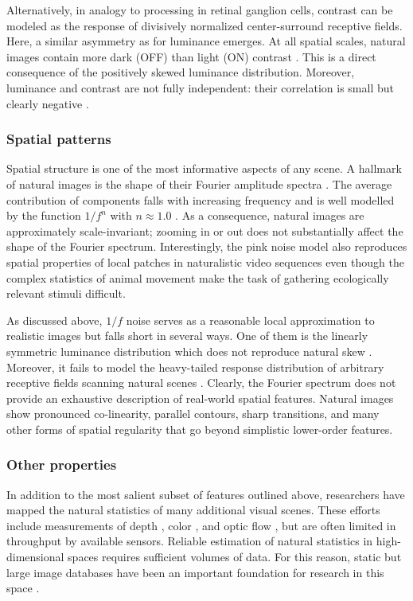 Alternatively, in analogy to processing in retinal ganglion cells, contrast can be modeled as the response of divisively normalized center-surround receptive fields. Here, a similar asymmetry as for luminance emerges. At all spatial scales, natural images contain more dark (OFF) than light (ON) contrast \citep{Ratliff:2010kb,Cooper:2015in}. This is a direct consequence of the positively skewed luminance distribution. Moreover, luminance and contrast are not fully independent: their correlation is small but clearly negative \citep{Geisler:2008gu}.

\subsubsection{Spatial patterns}
Spatial structure is one of the most informative aspects of any scene. A hallmark of natural images is the shape of their Fourier amplitude spectra \citep{Geisler:2008gu}. The average contribution of components falls with increasing frequency and is well modelled by the function $1/f^n$ with $n\approx1.0$ \citep{Field:1987ua,Ruderman:1994ty,Dyakova:2015dy}. As a consequence, natural images are approximately scale-invariant; zooming in or out does not substantially affect the shape of the Fourier spectrum. Interestingly, the pink noise model also reproduces spatial properties of local patches in naturalistic video sequences \citep{Dong:1995aa} even though the complex statistics of animal movement make the task of gathering ecologically relevant stimuli difficult.

As discussed above, $1/f$ noise serves as a reasonable local approximation to realistic images but falls short in several ways. One of them is the linearly symmetric luminance distribution which does not reproduce natural skew \citep{Geisler:2008gu}. Moreover, it fails to model the heavy-tailed response distribution of arbitrary receptive fields scanning natural scenes \citep{Field:1987ua}. Clearly, the Fourier spectrum does not provide an exhaustive description of real-world spatial features. Natural images show pronounced co-linearity, parallel contours, sharp transitions, and many other forms of spatial regularity that go beyond simplistic lower-order features.

\subsubsection{Other properties}
In addition to the most salient subset of features outlined above, researchers have mapped the natural statistics of many additional visual scenes. These efforts include measurements of depth \citep{Huang:2000aa}, color \citep{Ruderman:1998aa,Wachtler:2001aa}, and optic flow \citep{Roth:2005aa,Roth:2007bg}, but are often limited in throughput by available sensors. Reliable estimation of natural statistics in high-dimensional spaces requires sufficient volumes of data. For this reason, static but large image databases have been an important foundation for research in this space \citep{vanHateren:1998jt}.


